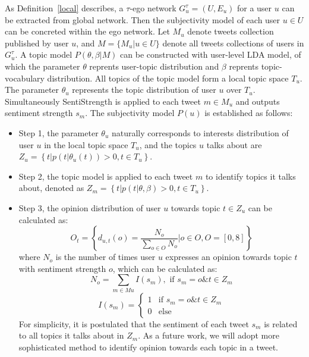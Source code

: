 \documentclass{acm_proc_article-sp}
\begin{document}
As Definition~\ref{local} describes, a $ \tau $-ego network $ G_{u}^{\tau}=\left( U,E_{u} \right)  $ for a user $ u $ can be extracted from global network. 
Then the subjectivity model of each user $ u \in U $ can be concreted within the ego network. 
Let $ M_{u}$ denote tweets collection published by user $ u $, and $ M=\lbrace M_{u} |u \in U \rbrace$ denote all tweets collections of users in $ G_{u}^{\tau} $. A topic model $P\left(\theta,\beta | M \right) $ can be constructed with user-level LDA model, of which the parameter $\theta$ reprents user-topic distribution and $\beta$ reprents topic-vocabulary distribution. All topics of the topic model form a local topic space $ T_{u} $. 
The parameter $ \theta_{u} $ represents the topic distribution of user $ u $ over $ T_{u} $. Simultaneously SentiStrength is applied to each tweet $ m \in M_{u} $ and outputs sentiment strength $ s_{m} $. 
The subjectivity model $P\left( u\right)  $ is established as follows:
\begin{itemize}
\item Step 1, the parameter $ \theta_{u} $ naturally corresponds to interests distribution of user $ u $ in the local topic space $ T_{u} $, and the topics $ u $ talks about are $ Z_{u}= \left\lbrace t \vert p\left( t \vert \theta_{u}\left( t \right)  \right)>0 , t \in T_{u}\right\rbrace $.
\item Step 2, the topic model is applied to each tweet $ m $ to identify topics it talks about, denoted as $ Z_{m} =\left\lbrace t \vert p\left( t \vert \theta, \beta \right)>0 , t \in T_{u} \right\rbrace $.
\item Step 3, the opinion distribution of user $ u $ towards topic $ t \in Z_{u} $ can be calculated as: 
\begin{equation}
\label{opinionall}
O_{t}= \left\lbrace d_{u,t}\left( o\right)= \dfrac{N_{o}}{\sum_{o \in O} N_{o}} |o \in O, O=\left[ 0,8 \right] \right\rbrace 
\end{equation}
where $ N_{o} $ is the number of times user $ u $ expresses an opinion towards topic $ t $ with sentiment strength $ o $, which can be calculated as:
\begin{equation}
\label{opinion1}
N_{o}=\sum_{m \in Mu} I\left( s_{m} \right) , \text{ if } s_{m}=o \& t \in Z_{m}
\end{equation}
\begin{equation}
\label{opinion2}
I\left( s_{m} \right)=\left\{
\begin{array}{ll}
{1} & \text{if } s_{m}=o \& t \in Z_{m}\\
{0} & \text{else}
\end{array}
\right.
\end{equation}
For simplicity, it is postulated that the sentiment of each tweet $ s_{m} $ is related to all topics it talks about in $ Z_{m} $. As a future work, we will adopt more sophisticated method to identify opinion towards each topic in a tweet.
\end{itemize}
\end{document}
